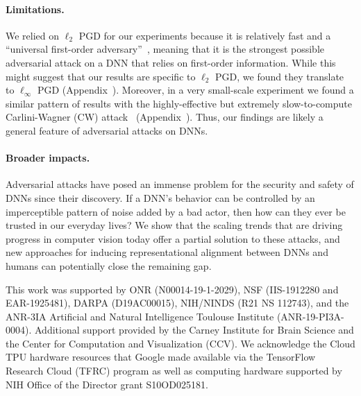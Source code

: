 \documentclass{article}
\theoremstyle{plain}
\theoremstyle{definition}
\theoremstyle{remark}
\begin{document}
\paragraph{Limitations.} We relied on $\ell_2$ PGD for our experiments because it is relatively fast and a ``universal first-order adversary''~\cite{PGD_madrytowards}, meaning that it is the strongest possible adversarial attack on a DNN that relies on first-order information. While this might suggest that our results are specific to $\ell_2$ PGD, we found they translate to $\ell_\infty$ PGD (Appendix~). Moreover, in a very small-scale experiment we found a similar pattern of results with the highly-effective but extremely slow-to-compute Carlini-Wagner (CW) attack~\cite{CW_carlini2017towards} (Appendix~). Thus, our findings are likely a general feature of adversarial attacks on DNNs.

\paragraph{Broader impacts.} Adversarial attacks have posed an immense problem for the security and safety of DNNs since their discovery. If a DNN's behavior can be controlled by an imperceptible pattern of noise added by a bad actor, then how can they ever be trusted in our everyday lives? We show that the scaling trends that are driving progress in computer vision today offer a partial solution to these attacks, and new approaches for inducing representational alignment between DNNs and humans can potentially close the remaining gap.

\begin{ack}
This work was supported by ONR (N00014-19-1-2029), NSF (IIS-1912280 and EAR-1925481), DARPA (D19AC00015), NIH/NINDS (R21 NS 112743), and the ANR-3IA Artificial and Natural Intelligence Toulouse Institute (ANR-19-PI3A-0004).
Additional support provided by the Carney Institute for Brain Science and the Center for Computation and Visualization (CCV). We acknowledge the Cloud TPU hardware resources that Google made available via the TensorFlow Research Cloud (TFRC) program as well as computing hardware supported by NIH Office of the Director grant S10OD025181.
\end{ack}

{\small


}

\clearpage
\setcounter{figure}{0}
\makeatletter 
\renewcommand{\thefigure}{S\@arabic\c@figure}
\makeatother
\setcounter{table}{0}
\makeatletter 
\renewcommand{\thetable}{S\@arabic\c@table}
\renewcommand{\thefigure}{S\arabic{figure}}
\makeatother
\end{document}
